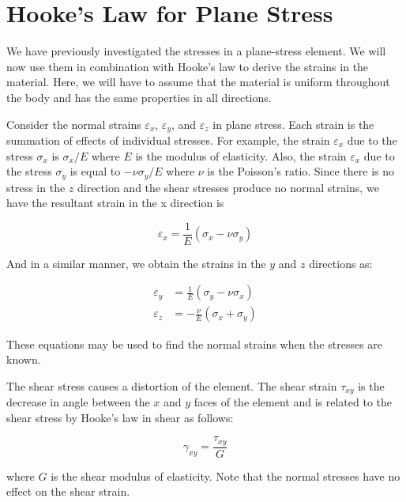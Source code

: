 \documentclass[
10pt,
a4paper,
openany,
svgnames,
]{book} %
\begin{document}
\section{Hooke’s Law for Plane Stress}

We have previously investigated the stresses in a plane-stress element. We will now use them in combination with Hooke’s law to derive the strains in the material. Here, we will have to assume that the material is uniform throughout the body and has the same properties in all directions.

Consider the normal strains $\varepsilon_x$, $\varepsilon_y$, and $\varepsilon_z$ in plane stress. Each strain is the summation of effects of individual stresses. For example, the strain $\varepsilon_x$ due to the stress $\sigma_x$ is $\sigma_x / E$ where $E$ is the modulus of elasticity. Also, the strain $\varepsilon_x$ due to the stress $\sigma_y$ is equal to $-\nu \sigma_y / E$ where $\nu$ is the Poisson’s ratio. Since there is no stress in the $z$ direction and the shear stresses produce no normal strains, we have the resultant strain in the x direction is

\begin{equation} \label{eqn: plane stress x}
  \varepsilon_x = \frac{1}{E}(\sigma_x - \nu \sigma_y)
\end{equation}

And in a similar manner, we obtain the strains in the $y$ and $z$ directions as:

\begin{align} \label{eqn: plane stress y and z}
  \varepsilon_y &= \frac{1}{E}(\sigma_y - \nu \sigma_x) \nonumber \\
  \varepsilon_z &=  - \frac{\nu }{E}(\sigma_x + \sigma_y)
\end{align}

These equations may be used to find the normal strains when the stresses are known.

The shear stress causes a distortion of the element. The shear strain $\tau_{xy}$ is the decrease in angle between the $x$ and $y$ faces of the element and is related to the shear stress by Hooke’s law in shear as follows:

\begin{equation}
  \gamma_{xy} = \frac{\tau_{xy}}{G}
\end{equation}

where $G$ is the shear modulus of elasticity. Note that the normal stresses have no effect on the shear strain.
\end{document}
